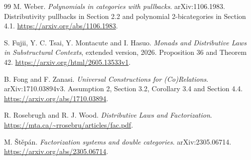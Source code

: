 \documentclass[11pt,a4paper]{article}
\theoremstyle{definition}
\begin{document}
\begin{thebibliography}{99}
M. Weber. \emph{Polynomials in categories with pullbacks}.
arXiv:1106.1983. Distributivity pullbacks in Section 2.2 and polynomial
2-bicategories in Section 4.1.
\url{https://arxiv.org/abs/1106.1983}.

S. Fujii, Y. C. Tsai, Y. Montacute and I. Hasuo.
\emph{Monads and Distributive Laws in Substructural Contexts}, extended
version, 2026. Proposition 36 and Theorem 42.
\url{https://arxiv.org/html/2605.13533v1}.

B. Fong and F. Zanasi. \emph{Universal Constructions for (Co)Relations}.
arXiv:1710.03894v3. Assumption 2, Section 3.2, Corollary 3.4 and Section 4.4.
\url{https://arxiv.org/abs/1710.03894}.

R. Rosebrugh and R. J. Wood. \emph{Distributive Laws and Factorization}.
\url{https://mta.ca/~rrosebru/articles/fac.pdf}.

M. \v{S}t\v{e}p\'an. \emph{Factorization systems and double categories}.
arXiv:2305.06714.
\url{https://arxiv.org/abs/2305.06714}.
\end{thebibliography}
\end{document}
